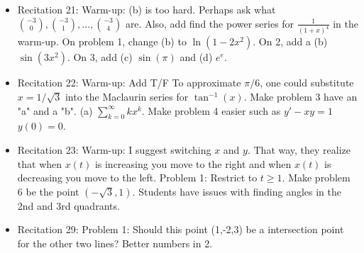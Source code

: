 \documentclass{article}
\begin{document}
\begin{itemize}
\item Recitation 21: Warm-up: (b) is too hard. Perhaps ask what ${-3 \choose 0}, {-3 \choose 1}, \ldots, {-3\choose 4}$ are. Also, add find the power series for $\frac{1}{(1+x)^4}$ in the warm-up. On problem 1, change (b) to $\ln (1-2x^2)$. On 2, add a (b) $\sin(3x^2)$. On 3, add (c) $\sin (\pi)$ and (d) $e^e$. 
\item Recitation 22: Warm-up: Add T/F To approximate $\pi/6$, one could substitute $x=1/\sqrt{3}$ into the Maclaurin series for $\tan^{-1}(x)$. Make problem 3 have an "a" and a "b". (a) $\sum_{k=0}^{\infty} k x^k$. Make problem 4 easier such as $y'-xy=1$ $y(0)=0$. 
\item Recitation 23: Warm-up: I suggest switching $x$ and $y$. That way, they realize that when $x(t)$ is increasing you move to the right and when $x(t)$ is decreasing you move to the left. Problem 1: Restrict to $t \geq 1$. Make problem 6 be the point $(-\sqrt{3}, 1)$. Students have issues with finding angles in the 2nd and 3rd quadrants.
\item Recitation 29: Problem 1: Should this point (1,-2,3) be a intersection point for the other two lines? Better numbers in 2. 
\end{itemize}
\end{document}
